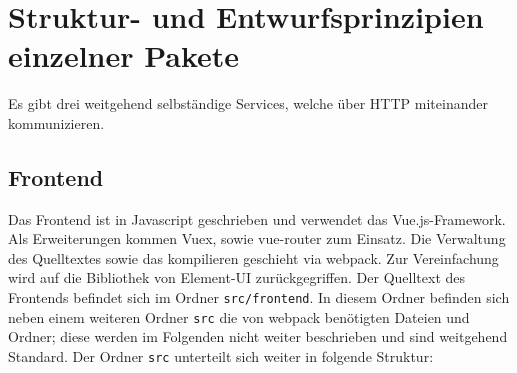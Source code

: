 \documentclass[a4paper,11pt,oneside, titlepage]{article}
\begin{document}
\section{Struktur- und Entwurfsprinzipien einzelner Pakete}
Es gibt drei weitgehend selbständige Services, welche über HTTP miteinander kommunizieren.
\subsection{Frontend}
Das Frontend ist in \gls{Javascript} geschrieben und verwendet das \gls{Vue.js}-Framework. Als Erweiterungen kommen \gls{Vuex}, sowie \gls{vue-router} zum Einsatz. Die Verwaltung des Quelltextes sowie das kompilieren geschieht via \gls{webpack}. Zur Vereinfachung wird auf die Bibliothek von \gls{Element-UI} zurückgegriffen. Der Quelltext des Frontends befindet sich im Ordner \verb+src/frontend+. In diesem Ordner befinden sich neben einem weiteren Ordner \verb+src+ die von \gls{webpack} benötigten Dateien und Ordner; diese werden im Folgenden nicht weiter beschrieben und sind weitgehend Standard. Der Ordner \verb+src+ unterteilt sich weiter in folgende Struktur:
\newline

\end{document}
